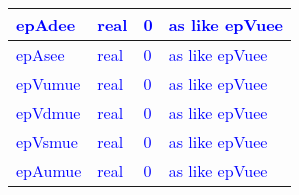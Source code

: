 \documentclass{article}
\begin{document}
\begin{longtable}{llll}
\midrule
\textcolor{blue}{epAdee} & \begin{minipage}[t]{2cm}\textcolor{blue}{real}\end{minipage} & \begin{minipage}[t]{2cm}\textcolor{blue}{0}\end{minipage} & \begin{minipage}[t]{12cm}\textcolor{blue}{as like epVuee}\end{minipage}\\*
\midrule
\textcolor{blue}{epAsee} & \begin{minipage}[t]{2cm}\textcolor{blue}{real}\end{minipage} & \begin{minipage}[t]{2cm}\textcolor{blue}{0}\end{minipage} & \begin{minipage}[t]{12cm}\textcolor{blue}{as like epVuee}\end{minipage}\\*
\midrule
\textcolor{blue}{epVumue} & \begin{minipage}[t]{2cm}\textcolor{blue}{real}\end{minipage} & \begin{minipage}[t]{2cm}\textcolor{blue}{0}\end{minipage} & \begin{minipage}[t]{12cm}\textcolor{blue}{as like epVuee}\end{minipage}\\*
\midrule
\textcolor{blue}{epVdmue} & \begin{minipage}[t]{2cm}\textcolor{blue}{real}\end{minipage} & \begin{minipage}[t]{2cm}\textcolor{blue}{0}\end{minipage} & \begin{minipage}[t]{12cm}\textcolor{blue}{as like epVuee}\end{minipage}\\*
\midrule
\textcolor{blue}{epVsmue} & \begin{minipage}[t]{2cm}\textcolor{blue}{real}\end{minipage} & \begin{minipage}[t]{2cm}\textcolor{blue}{0}\end{minipage} & \begin{minipage}[t]{12cm}\textcolor{blue}{as like epVuee}\end{minipage}\\*
\midrule
\textcolor{blue}{epAumue} & \begin{minipage}[t]{2cm}\textcolor{blue}{real}\end{minipage} & \begin{minipage}[t]{2cm}\textcolor{blue}{0}\end{minipage} & \begin{minipage}[t]{12cm}\textcolor{blue}{as like epVuee}\end{minipage}\\*

\end{longtable}
\end{document}
